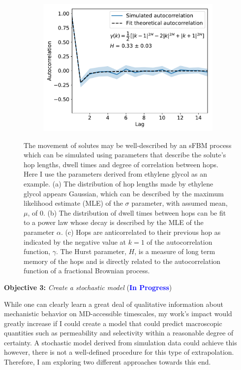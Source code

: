 \documentclass{article}
\begin{document}
\begin{figure}[h!]
\begin{subfigure}{0.325\textwidth}
  \caption{}\label{fig:dwell_dist}
  \end{subfigure}
  \begin{subfigure}{0.325\textwidth}
  \includegraphics[width=\linewidth]{hop_acf_GCL.pdf}
  \caption{}\label{fig:hop_acf}
  \end{subfigure}
  \caption{The movement of solutes may be well-described by an sFBM process 
  which can be simulated using parameters that describe the solute's hop lengths, 
  dwell times and degree of correlation between hops. Here I use the parameters 
  derived from ethylene glycol as an example. (a) The distribution of hop
  lengths made by ethylene glycol appears Gaussian, which can be described by the
  maximum likelihood estimate (MLE) of the $\sigma$ parameter, with assumed mean, 
  $\mu$, of 0. (b) The distribution of dwell times between hops can be fit to a 
  power law whose decay is described by the MLE of the parameter $\alpha$. 
  (c) Hops are anticorrelated to their previous hop as indicated by the negative
  value at $k=1$ of the autocorrelation function, $\gamma$. The Hurst 
  parameter, $H$, is a measure of long term memory of the hops and is directly
  related to the autocorrelation function of a fractional Brownian process.}\label{fig:distributions}
  \end{figure}
  
  \noindent \textbf{\large Objective 3:} \textit{\large Create a stochastic model} (\textcolor{blue}{\textbf{In Progress}})
  
  While one can clearly learn a great deal of qualitative information about 
  mechanistic behavior on MD-accessible timescales, my work's impact would
  greatly increase if I could create a model that could predict macroscopic
  quantities such as permeability and selectivity within a reasonable degree
  of certainty. A stochastic model derived from simulation data could achieve 
  this however, there is not a well-defined procedure for this type of 
  extrapolation. Therefore, I am exploring two different approaches towards
  this end. 
\end{document}
